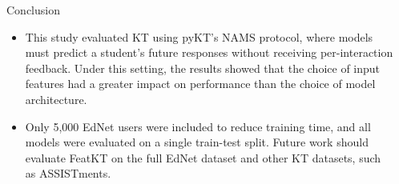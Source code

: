 \documentclass[final,xcolor={table}]{beamer}
\newlength{\sepwidth}
\newlength{\colwidth}
\newcommand{\separatorcolumn}{\begin{column}{\sepwidth}\end{column}}
\newenvironment{posterbullets}{%
  \begingroup
  \setlength{\leftmargini}{0.82cm}%
  \begin{itemize}
  \setlength{\topsep}{0pt}%
  \setlength{\partopsep}{0pt}%
  \setlength{\parsep}{0pt}%
  \setlength{\itemsep}{0.14ex}%
}{%
  \end{itemize}
  \endgroup
}
\begin{document}
\begin{frame}[t]
\begin{columns}[t]
\begin{column}{\colwidth}
\begin{block}{Conclusion}
\begin{posterbullets}
  \item This study evaluated KT using pyKT's NAMS protocol, where models must
        predict a student's future responses without receiving
        per-interaction feedback. Under this setting, the results showed that
        the choice of input features had a greater impact on performance than
        the choice of model architecture.
  \item Only 5{,}000 EdNet users were included to reduce training time, and
        all models were evaluated on a single train-test split. Future work
        should evaluate FeatKT on the full EdNet dataset and other KT
        datasets, such as ASSISTments.
\end{posterbullets}
\end{block}

\end{column}
\separatorcolumn
\end{columns}

\end{frame}
\end{document}
